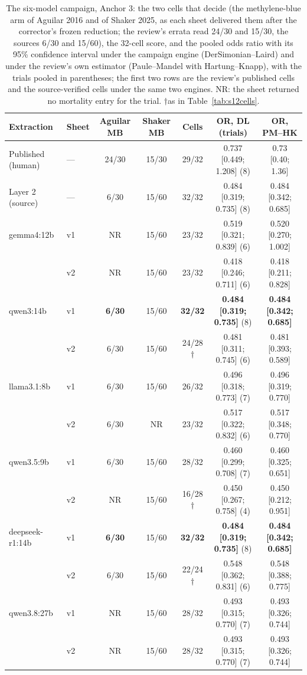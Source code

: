 \documentclass[11pt]{article}
\begin{document}
\begin{table}[H]
\centering\footnotesize
\caption{The six-model campaign, Anchor 3: the two cells that decide (the methylene-blue arm of Aguilar 2016 and of Shaker 2025, as each sheet delivered them after the corrector's frozen reduction; the review's errata read 24/30 and 15/30, the sources 6/30 and 15/60), the 32-cell score, and the pooled odds ratio with its 95\% confidence interval under the campaign engine (DerSimonian--Laird) and under the review's own estimator (Paule--Mandel with Hartung--Knapp), with the trials pooled in parentheses; the first two rows are the review's published cells and the source-verified cells under the same two engines. NR: the sheet returned no mortality entry for the trial. $\dagger$as in Table~\ref{tab:s12cells}.}
\label{tab:s12a3}
\setlength{\tabcolsep}{2.5pt}
\begin{tabular}{llccccc}
\toprule
Extraction & Sheet & Aguilar MB & Shaker MB & Cells & OR, DL (trials) & OR, PM--HK \\
\midrule
Published (human) & --- & 24/30 & 15/30 & 29/32 & 0.737 [0.449; 1.208] (8) & 0.73 [0.40; 1.36] \\
Layer 2 (source) & --- & 6/30 & 15/60 & 32/32 & 0.484 [0.319; 0.735] (8) & 0.484 [0.342; 0.685] \\
\midrule
gemma4:12b & v1 & NR & 15/60 & 23/32 & 0.519 [0.321; 0.839] (6) & 0.520 [0.270; 1.002] \\
 & v2 & NR & 15/60 & 23/32 & 0.418 [0.246; 0.711] (6) & 0.418 [0.211; 0.828] \\
qwen3:14b & v1 & \textbf{6/30} & 15/60 & \textbf{32/32} & \textbf{0.484 [0.319; 0.735]} (8) & \textbf{0.484 [0.342; 0.685]} \\
 & v2 & 6/30 & 15/60 & 24/28$\dagger$ & 0.481 [0.311; 0.745] (6) & 0.481 [0.393; 0.589] \\
llama3.1:8b & v1 & 6/30 & 15/60 & 26/32 & 0.496 [0.318; 0.773] (7) & 0.496 [0.319; 0.770] \\
 & v2 & 6/30 & NR & 23/32 & 0.517 [0.322; 0.832] (6) & 0.517 [0.348; 0.770] \\
qwen3.5:9b & v1 & 6/30 & 15/60 & 28/32 & 0.460 [0.299; 0.708] (7) & 0.460 [0.325; 0.651] \\
 & v2 & NR & 15/60 & 16/28$\dagger$ & 0.450 [0.267; 0.758] (4) & 0.450 [0.212; 0.951] \\
deepseek-r1:14b & v1 & \textbf{6/30} & 15/60 & \textbf{32/32} & \textbf{0.484 [0.319; 0.735]} (8) & \textbf{0.484 [0.342; 0.685]} \\
 & v2 & 6/30 & 15/60 & 22/24$\dagger$ & 0.548 [0.362; 0.831] (6) & 0.548 [0.388; 0.775] \\
qwen3.8:27b & v1 & NR & 15/60 & 28/32 & 0.493 [0.315; 0.770] (7) & 0.493 [0.326; 0.744] \\
 & v2 & NR & 15/60 & 28/32 & 0.493 [0.315; 0.770] (7) & 0.493 [0.326; 0.744] \\
\bottomrule
\end{tabular}
\end{table}
\end{document}
